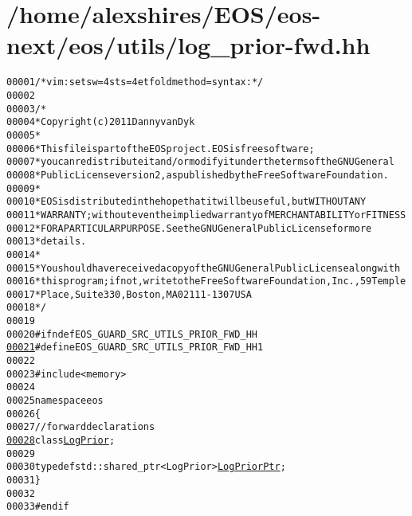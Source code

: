 \hypertarget{log__prior-fwd_8hh_source}{
\section{/home/alexshires/EOS/eos-\/next/eos/utils/log\_\-prior-\/fwd.hh}
}


\begin{footnotesize}\begin{alltt}
00001 \textcolor{comment}{/* vim: set sw=4 sts=4 et foldmethod=syntax : */}
00002 
00003 \textcolor{comment}{/*}
00004 \textcolor{comment}{ * Copyright (c) 2011 Danny van Dyk}
00005 \textcolor{comment}{ *}
00006 \textcolor{comment}{ * This file is part of the EOS project. EOS is free software;}
00007 \textcolor{comment}{ * you can redistribute it and/or modify it under the terms of the GNU General}
00008 \textcolor{comment}{ * Public License version 2, as published by the Free Software Foundation.}
00009 \textcolor{comment}{ *}
00010 \textcolor{comment}{ * EOS is distributed in the hope that it will be useful, but WITHOUT ANY}
00011 \textcolor{comment}{ * WARRANTY; without even the implied warranty of MERCHANTABILITY or FITNESS}
00012 \textcolor{comment}{ * FOR A PARTICULAR PURPOSE.  See the GNU General Public License for more}
00013 \textcolor{comment}{ * details.}
00014 \textcolor{comment}{ *}
00015 \textcolor{comment}{ * You should have received a copy of the GNU General Public License along with}
00016 \textcolor{comment}{ * this program; if not, write to the Free Software Foundation, Inc., 59 Temple}
00017 \textcolor{comment}{ * Place, Suite 330, Boston, MA  02111-1307  USA}
00018 \textcolor{comment}{ */}
00019 
00020 \textcolor{preprocessor}{#ifndef EOS\_GUARD\_SRC\_UTILS\_PRIOR\_FWD\_HH}
\hypertarget{log__prior-fwd_8hh_source_l00021}{}\hyperlink{log__prior-fwd_8hh_ac4831647c914184f821ad29b00a75754}{00021} \textcolor{preprocessor}{}\textcolor{preprocessor}{#define EOS\_GUARD\_SRC\_UTILS\_PRIOR\_FWD\_HH 1}
00022 \textcolor{preprocessor}{}
00023 \textcolor{preprocessor}{#include <memory>}
00024 
00025 \textcolor{keyword}{namespace }eos
00026 \{
00027     \textcolor{comment}{// forward declarations}
\hypertarget{log__prior-fwd_8hh_source_l00028}{}\hyperlink{namespaceeos_ac5481e3b46ee55ff24606ee7f6e78651}{00028}     \textcolor{keyword}{class }\hyperlink{classeos_1_1LogPrior}{LogPrior};
00029 
00030     \textcolor{keyword}{typedef} std::shared\_ptr<LogPrior> \hyperlink{namespaceeos_ac5481e3b46ee55ff24606ee7f6e78651}{LogPriorPtr};
00031 \}
00032 
00033 \textcolor{preprocessor}{#endif}
\end{alltt}\end{footnotesize}
